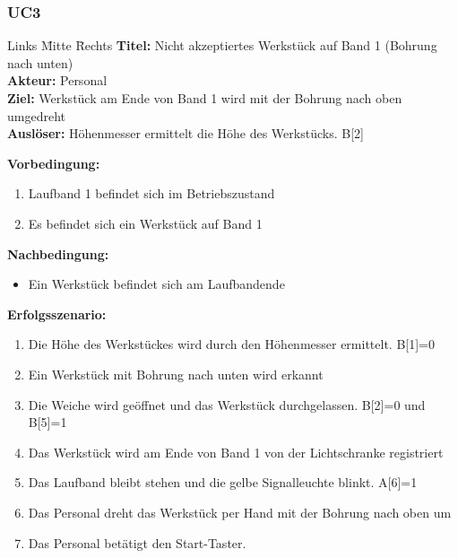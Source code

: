 \documentclass[oneside,a4paper,titlepage]{scrartcl} %
\begin{document}
\subsubsection{UC3}
\begin{tabbing}
 Links \= Mitte \= Rechts \kill
 \textbf{Titel:} \> \> Nicht akzeptiertes Werkstück auf Band 1 (Bohrung nach unten)\\
 \textbf{Akteur:} \> \> Personal\\
 \textbf{Ziel:} \> \> Werkstück am Ende von Band 1 wird mit der Bohrung nach oben umgedreht\\
 \textbf{Auslöser:} \> \> Höhenmesser ermittelt die Höhe des Werkstücks. B[2]\\
\end{tabbing}
\textbf{Vorbedingung:}
\begin{enumerate}
 \item Laufband 1 befindet sich im Betriebszustand
 \item Es befindet sich ein Werkstück auf Band 1
\end{enumerate}
\textbf{Nachbedingung:}
\begin{itemize}
 \item Ein Werkstück befindet sich am Laufbandende
\end{itemize}
\textbf{Erfolgsszenario:}
\begin{enumerate}
 \item Die Höhe des Werkstückes wird durch den Höhenmesser ermittelt. B[1]=0
 \item Ein Werkstück mit Bohrung nach unten wird erkannt
 \item Die Weiche wird geöffnet und das Werkstück durchgelassen. B[2]=0 und B[5]=1
 \item Das Werkstück wird am Ende von Band 1 von der Lichtschranke registriert
 \item Das Laufband bleibt stehen und die gelbe Signalleuchte blinkt. A[6]=1
 \item Das Personal dreht das Werkstück per Hand mit der Bohrung nach oben um
 \item Das Personal betätigt den Start-Taster.
\end{enumerate}
\end{document}
